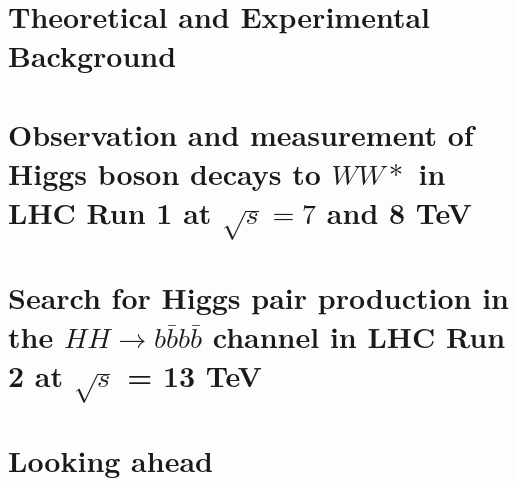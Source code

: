 \documentclass{Dissertate}
\begin{document}


\maketitle
\copyrightpage

\abstractpage
\tableofcontents
\listoffigures
\listoftables
\dedicationpage
\acknowledgments

\doublespacing

\setcounter{chapter}{-1}  %

\part{Theoretical and Experimental Background}



\part{Observation and measurement of Higgs boson decays to $WW*$ in LHC Run 1 at $\sqrt{s} = 7$ and 8 TeV}









\part{Search for Higgs pair production in the $HH\rightarrow
  b\bar{b}b\bar{b}$ channel in LHC Run 2 at $\sqrt{s}$ = 13 TeV}






\part{Looking ahead}

\begin{appendices}
   
   
\end{appendices}


\clearpage
{}




\end{document}
